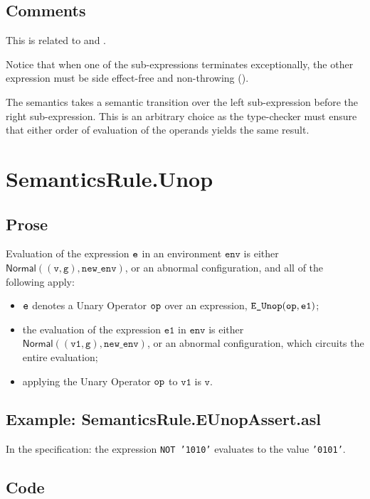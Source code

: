 \documentclass{book}
\newcommand\Normal[0]{\textsf{Normal}}
\newcommand\newenv[0]{\texttt{new\_env}}
\newcommand\env[0]{\texttt{env}}
\newcommand\vg[0]{\texttt{g}}
\newcommand\vv[0]{\texttt{v}}
\newcommand\vvone[0]{\texttt{v1}}
\newcommand\veone[0]{\texttt{e1}}
\begin{document}
\subsection{Comments}
  This is related to  and .

Notice that when one of the sub-expressions terminates exceptionally,
the other expression must be side effect-free and non-throwing ().

The semantics takes a semantic transition over the left sub-expression before the right sub-expression.
This is an arbitrary choice as the type-checker must ensure that either order of evaluation of the operands
yields the same result.

\section{SemanticsRule.Unop \label{sec:SemanticsRule.Unop}}
  \subsection{Prose}
  Evaluation of the expression $\texttt{e}$ in an environment $\env$ is either \\
  $\Normal((\vv, \vg), \newenv)$,
  or an abnormal configuration, and all of the following apply:
  \begin{itemize}
  \item $\texttt{e}$ denotes a Unary Operator $\texttt{op}$ over an expression, $\texttt{E\_Unop}(\op, \veone)$;
  \item the evaluation of the expression $\veone$ in $\env$ is either \\ $\Normal((\vvone, \vg), \newenv)$,
  or an abnormal configuration, which circuits the entire evaluation;
  \item applying the Unary Operator $\texttt{op}$ to $\vvone$ is $\vv$.
  \end{itemize}

  \subsection{Example: SemanticsRule.EUnopAssert.asl}
    In the specification:
    the expression \texttt{NOT '1010'} evaluates to the value \texttt{'0101'}.

  \subsection{Code}
\end{document}
